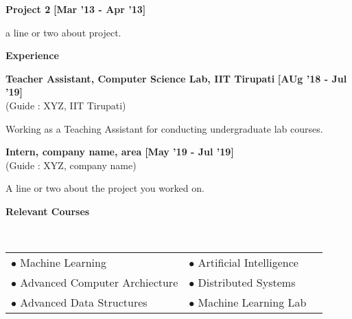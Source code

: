 \documentclass[a4paper,10pt]{article}
\begin{document}
\begin{itemize*}
  \setlength{\itemsep}{1pt}
  \item \textbf{\small{Project 2}} \hfill {\small{{\textbf{[Mar '13 - Apr '13]}}}\/}
\begin{itemize*}
	\item a line or two about project.
\end{itemize*}
\end{itemize*}

\colorbox{titleColor}{\parbox{6.7in}{\textbf{Experience}}}
\begin{itemize*}
  \setlength{\itemsep}{.00pt}
  \item \textbf{{Teacher Assistant, Computer Science Lab, IIT Tirupati}} \hfill {\small{{\textbf{[AUg '18 - Jul '19]}}\/}} \\
{(Guide : XYZ, IIT Tirupati)}
      \begin{itemize*}
       \item Working as a Teaching Assistant for conducting undergraduate lab courses.
      \end{itemize*}
     \end{itemize*}
\begin{itemize*}
  \setlength{\itemsep}{.00pt}
  \item \textbf{{Intern, company name, area}} \hfill {\small{{\textbf{[May '19 - Jul '19]}}\/}} \\
{(Guide : XYZ, company name)}
      \begin{itemize*}
       \item A line or two about the project you worked on.
      \end{itemize*}
     \end{itemize*}

\colorbox{titleColor}{\parbox{6.7in}{\textbf{Relevant Courses}}}\\[0.08in]
\begin{tabular}{p{3.5in}p{3in}p{2.5in}}
\hspace{0.9pc}$\bullet$ Machine Learning &$\bullet$ Artificial Intelligence\\[0.05in]
\hspace{0.9pc}$\bullet$ Advanced Computer Archiecture&$\bullet$ Distributed Systems\\[0.05in]
\hspace{0.9pc}$\bullet$ Advanced Data Structures&$\bullet$ Machine Learning Lab \\[0.05in]
\end{tabular}
\end{document}
